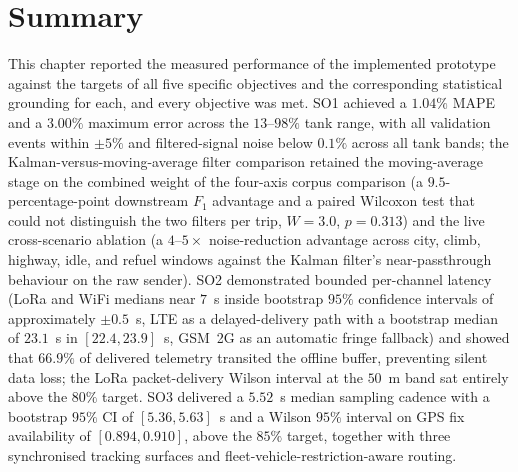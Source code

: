 \FloatBarrier

\section{Summary}

This chapter reported the measured performance of the implemented prototype against the targets of all five specific objectives and the corresponding statistical grounding for each, and every objective was met. SO1 achieved a $1.04\%$ MAPE and a $3.00\%$ maximum error across the $13$--$98\%$ tank range, with all validation events within $\pm 5\%$ and filtered-signal noise below $0.1\%$ across all tank bands; the Kalman-versus-moving-average filter comparison retained the moving-average stage on the combined weight of the four-axis corpus comparison (a $9.5$-percentage-point downstream $F_1$ advantage and a paired Wilcoxon test that could not distinguish the two filters per trip, $W = 3.0$, $p = 0.313$) and the live cross-scenario ablation (a $4$--$5\times$ noise-reduction advantage across city, climb, highway, idle, and refuel windows against the Kalman filter's near-passthrough behaviour on the raw sender). SO2 demonstrated bounded per-channel latency (LoRa and WiFi medians near $7$~s inside bootstrap $95\%$ confidence intervals of approximately $\pm 0.5$~s, LTE as a delayed-delivery path with a bootstrap median of $23.1$~s in $[22.4, 23.9]$~s, GSM~2G as an automatic fringe fallback) and showed that $66.9\%$ of delivered telemetry transited the offline buffer, preventing silent data loss; the LoRa packet-delivery Wilson interval at the $50$~m band sat entirely above the $80\%$ target. SO3 delivered a $5.52$~s median sampling cadence with a bootstrap $95\%$ CI of $[5.36, 5.63]$~s and a Wilson $95\%$ interval on GPS fix availability of $[0.894, 0.910]$, above the $85\%$ target, together with three synchronised tracking surfaces and fleet-vehicle-restriction-aware routing.

